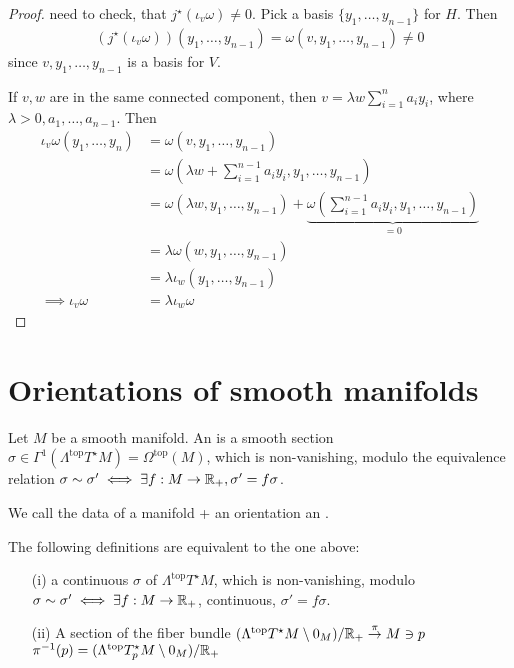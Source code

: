 \begin{proof}
     need to check, that \(j^\star(\iota_v\omega)\neq 0\).  Pick a basis \(\{y_1,\dots,y_{n-1}\}\) for \(H\). Then 
    \begin{align*}
        (j^\star(\iota_v\omega))(y_1,\dots,y_{n-1})=\omega(v,y_1,\dots,y_{n-1})\neq 0
    \end{align*}
    since \(v,y_1,\dots,y_{n-1}\) is a basis for \(V\).
    
     If \(v,w\) are in the same connected component, then \(v=\lambda w\sum_{i=1}^n a_iy_i\), where 
    \(\lambda>0,a_1,\dots,a_{n-1}\). Then 
    \begin{align*}
        \iota_v\omega(y_1,\dots,y_n)&=\omega(v,y_1,\dots,y_{n-1})\\
        &=\omega(\lambda w+ \sum_{i=1}^{n-1}a_i y_i,y_1,\dots,y_{n-1})\\
        &=\omega(\lambda w,y_1,\dots,y_{n-1})+\underbrace{\omega(\sum_{i=1}^{n-1}a_iy_i,y_1,\dots,y_{n-1})}_{=0}\\
        &=\lambda\omega(w,y_1,\dots,y_{n-1})\\
        &=\lambda\iota_w(y_1,\dots,y_{n-1})\\
        \implies \iota_v\omega&=\lambda\iota_w\omega
    \end{align*}
\end{proof}

\section{Orientations of smooth manifolds}

\begin{definition*}
    Let \(M\) be a smooth manifold.  An  is a smooth section 
    \(\sigma\in\Gamma^1(\Lambda^{\text{top}}T^\star M)=\Omega^{\text{top}}(M)\), which is non-vanishing, modulo the 
    equivalence relation \(\sigma\sim\sigma'\iff \exists f:M\to\mathbb{R}_+,\sigma'=f\sigma\).
    
    We call the data of a manifold + an orientation an .
\end{definition*}

\begin{remark}
    The following definitions are equivalent to the one above:
    \begin{enumerate}
        \item[(i)] a continuous \(\sigma\) of \(\Lambda^{\text{top}}T^\star M\), 
                   which is non-vanishing, modulo \(\sigma\sim\sigma'\iff \exists f:M\to\mathbb{R}_+\), continuous, \(\sigma'=f\sigma\). 
        \item[(ii)] A section of the fiber bundle \((\Lambda^{\text{top}}T^\star M\setminus 0_M)/\mathbb{R}_+\stackrel{\pi}{\to}M\ni p\)
                    \(\pi^{-1}(p)=(\Lambda^{\text{top}}T_p^\star M\setminus 0_M)/\mathbb{R}_+\)            
    \end{enumerate}
\end{remark}

